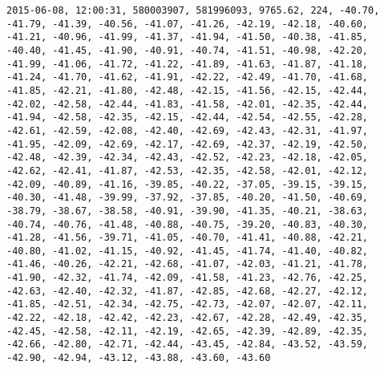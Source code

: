 \begin{lstlisting}
2015-06-08, 12:00:31, 580003907, 581996093, 9765.62, 224, -40.70, -41.79, -41.39, -40.56, -41.07, -41.26, -42.19, -42.18, -40.60, -41.21, -40.96, -41.99, -41.37, -41.94, -41.50, -40.38, -41.85, -40.40, -41.45, -41.90, -40.91, -40.74, -41.51, -40.98, -42.20, -41.99, -41.06, -41.72, -41.22, -41.89, -41.63, -41.87, -41.18, -41.24, -41.70, -41.62, -41.91, -42.22, -42.49, -41.70, -41.68, -41.85, -42.21, -41.80, -42.48, -42.15, -41.56, -42.15, -42.44, -42.02, -42.58, -42.44, -41.83, -41.58, -42.01, -42.35, -42.44, -41.94, -42.58, -42.35, -42.15, -42.44, -42.54, -42.55, -42.28, -42.61, -42.59, -42.08, -42.40, -42.69, -42.43, -42.31, -41.97, -41.95, -42.09, -42.69, -42.17, -42.69, -42.37, -42.19, -42.50, -42.48, -42.39, -42.34, -42.43, -42.52, -42.23, -42.18, -42.05, -42.62, -42.41, -41.87, -42.53, -42.35, -42.58, -42.01, -42.12, -42.09, -40.89, -41.16, -39.85, -40.22, -37.05, -39.15, -39.15, -40.30, -41.48, -39.99, -37.92, -37.85, -40.20, -41.50, -40.69, -38.79, -38.67, -38.58, -40.91, -39.90, -41.35, -40.21, -38.63, -40.74, -40.76, -41.48, -40.88, -40.75, -39.20, -40.83, -40.30, -41.28, -41.56, -39.71, -41.05, -40.70, -41.41, -40.88, -42.21, -40.80, -41.02, -41.15, -40.92, -41.45, -41.74, -41.40, -40.82, -41.46, -40.26, -42.21, -42.68, -41.07, -42.03, -41.21, -41.78, -41.90, -42.32, -41.74, -42.09, -41.58, -41.23, -42.76, -42.25, -42.63, -42.40, -42.32, -41.87, -42.85, -42.68, -42.27, -42.12, -41.85, -42.51, -42.34, -42.75, -42.73, -42.07, -42.07, -42.11, -42.22, -42.18, -42.42, -42.23, -42.67, -42.28, -42.49, -42.35, -42.45, -42.58, -42.11, -42.19, -42.65, -42.39, -42.89, -42.35, -42.66, -42.80, -42.71, -42.44, -43.45, -42.84, -43.52, -43.59, -42.90, -42.94, -43.12, -43.88, -43.60, -43.60

\end{lstlisting}
